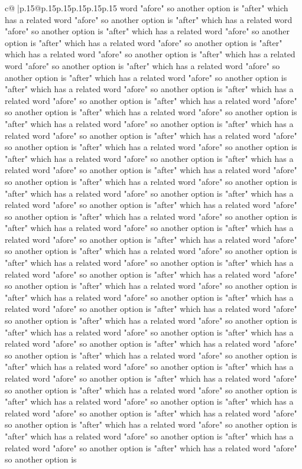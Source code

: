\documentclass{article}
\begin{document}
{\begin{supertabular}{c@{$\;$}|p{.15\linewidth}@{}p{.15\linewidth}p{.15\linewidth}p{.15\linewidth}p{.15\linewidth}p{.15\linewidth}}
{{{word "afore" so another option is "after" which has a related word "afore" so another option is "after" which has a related word "afore" so another option is "after" which has a related word "afore" so another option is "after" which has a related word "afore" so another option is "after" which has a related word "afore" so another option is "after" which has a related word "afore" so another option is "after" which has a related word "afore" so another option is "after" which has a related word "afore" so another option is "after" which has a related word "afore" so another option is "after" which has a related word "afore" so another option is "after" which has a related word "afore" so another option is "after" which has a related word "afore" so another option is "after" which has a related word "afore" so another option is "after" which has a related word "afore" so another option is "after" which has a related word "afore" so another option is "after" which has a related word "afore" so another option is "after" which has a related word "afore" so another option is "after" which has a related word "afore" so another option is "after" which has a related word "afore" so another option is "after" which has a related word "afore" so another option is "after" which has a related word "afore" so another option is "after" which has a related word "afore" so another option is "after" which has a related word "afore" so another option is "after" which has a related word "afore" so another option is "after" which has a related word "afore" so another option is "after" which has a related word "afore" so another option is "after" which has a related word "afore" so another option is "after" which has a related word "afore" so another option is "after" which has a related word "afore" so another option is "after" which has a related word "afore" so another option is "after" which has a related word "afore" so another option is "after" which has a related word "afore" so another option is "after" which has a related word "afore" so another option is "after" which has a related word "afore" so another option is "after" which has a related word "afore" so another option is "after" which has a related word "afore" so another option is "after" which has a related word "afore" so another option is "after" which has a related word "afore" so another option is "after" which has a related word "afore" so another option is "after" which has a related word "afore" so another option is "after" which has a related word "afore" so another option is "after" which has a related word "afore" so another option is "after" which has a related word "afore" so another option is "after" which has a related word "afore" so another option is "after" which has a related word "afore" so another option is "after" which has a related word "afore" so another option is "after" which has a related word "afore" so another option is "after" which has a related word "afore" so another option is "after" which has a related word "afore" so another option is "after" which has a related word "afore" so another option is "after" which has a related word "afore" so another option is }}}
\end{supertabular}}
\end{document}
